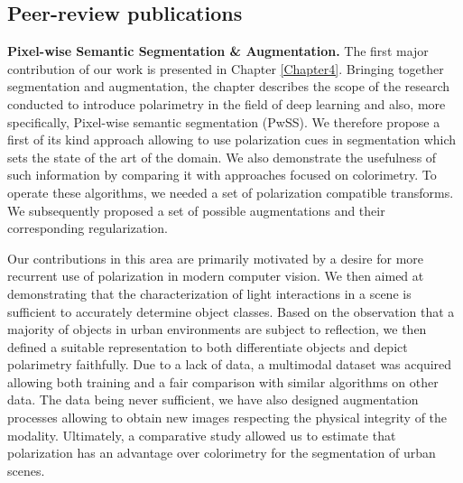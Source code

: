 \subsection{Peer-review publications}
\textbf{Pixel-wise Semantic Segmentation \& Augmentation. }The first major contribution of our work is presented in Chapter \ref{Chapter4}. Bringing together segmentation and augmentation, the chapter describes the scope of the research conducted to introduce polarimetry in the field of deep learning and also, more specifically, Pixel-wise semantic segmentation (PwSS).
We therefore propose a first of its kind approach allowing to use polarization cues in segmentation which sets the state of the art of the domain. We also demonstrate the usefulness of such information by comparing it with approaches focused on colorimetry. To operate these algorithms, we needed a set of polarization compatible transforms. We subsequently proposed a set of possible augmentations and their corresponding regularization.

Our contributions in this area are primarily motivated by a desire for more recurrent use of polarization in modern computer vision. We then aimed at demonstrating that the characterization of light interactions in a scene is sufficient to accurately determine object classes. Based on the observation that a majority of objects in urban environments are subject to reflection, we then defined a suitable representation to both differentiate objects and depict polarimetry faithfully. 
Due to a lack of data, a multimodal dataset was acquired allowing both training and a fair comparison with similar algorithms on other data. The data being never sufficient, we have also designed augmentation processes allowing to obtain new images respecting the physical integrity of the modality.
Ultimately, a comparative study allowed us to estimate that polarization has an advantage over colorimetry for the segmentation of urban scenes.\\

